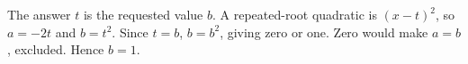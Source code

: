 The answer $t$ is the requested value $b$. A repeated-root quadratic is $(x-t)^2$, so $a=-2t$ and $b=t^2$. Since $t=b$, $b=b^2$, giving zero or one. Zero would make $a=b$, excluded. Hence $\boxed{b=1}$.
